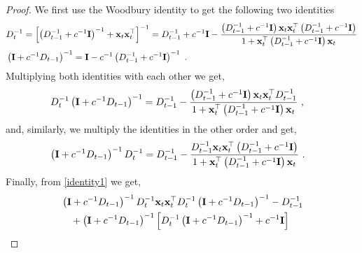 \begin{proof}
We first use the Woodbury identity to get the following two identities
\begin{align*}
&D_{t}^{-1}=\left[\left(D_{t-1}^{-1}+c^{-1}\mathbf{I}\right)^{-1}+\mathbf{x}_{t}{\mathbf{x}}^{\top}_{t}\right]^{-1}=D_{t-1}^{-1}+c^{-1}\mathbf{I}-\frac{\left(D_{t-1}^{-1}+c^{-1}\mathbf{I}\right)\mathbf{x}_{t}{\mathbf{x}}^{\top}_{t}
\left(D_{t-1}^{-1}+c^{-1}\mathbf{I}\right)}{1+{\mathbf{x}}^{\top}_{t}\left(D_{t-1}^{-1}+c^{-1}\mathbf{I}\right)\mathbf{x}_{t}}\\
&\left(\mathbf{I}+c^{-1}D_{t-1}\right)^{-1}=\mathbf{I}-c^{-1}\left(D_{t-1}^{-1}+c^{-1}\mathbf{I}\right)^{-1}~.
\end{align*}
Multiplying both identities with each other we get, %
\begin{align}
 & D_{t}^{-1}\left(\mathbf{I}+c^{-1}D_{t-1}\right)^{-1}
 = D_{t-1}^{-1}-\frac{\left(D_{t-1}^{-1}+c^{-1}\mathbf{I}\right)\mathbf{x}_{t}{\mathbf{x}}^{\top}_{t}D_{t-1}^{-1}}{1+{\mathbf{x}}^{\top}_{t}\left(D_{t-1}^{-1}+c^{-1}\mathbf{I}\right)\mathbf{x}_{t}}~,\label{identity1}
\end{align}
and, similarly, we multiply the identities in the other order and get,%
\begin{align}
&  \left(\mathbf{I}+c^{-1}D_{t-1}\right)^{-1}D_{t}^{-1}
 =D_{t-1}^{-1}-\frac{D_{t-1}^{-1}\mathbf{x}_{t}{\mathbf{x}}^{\top}_{t}\left(D_{t-1}^{-1}+c^{-1}\mathbf{I}\right)}{1+{\mathbf{x}}^{\top}_{t}\left(D_{t-1}^{-1}+c^{-1}\mathbf{I}\right)\mathbf{x}_{t}}~.
\label{identity2}
\end{align}
Finally, from \eqref{identity1} we get,
\begin{align*}
&\left(\mi+c^{-1}D_{t-1}\right)^{-1}D_{t}^{-1}\vxi{t}\vxti{t}D_{t}^{-1}\left(\mi+c^{-1}D_{t-1}\right)^{-1}-D_{t-1}^{-1}\\
&\quad+\left(\mi+c^{-1}D_{t-1}\right)^{-1}\left[D_{t}^{-1}\left(\mi+c^{-1}D_{t-1}\right)^{-1}+c^{-1}\mi\right]\\

\end{align*}
\end{proof}
